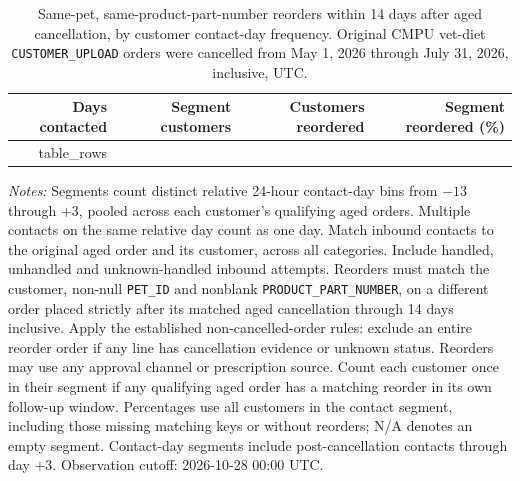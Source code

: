 \begin{table}[!htbp]
\centering
\caption{Same-pet, same-product-part-number reorders within 14 days after aged cancellation, by customer contact-day frequency. Original CMPU vet-diet \texttt{CUSTOMER\_UPLOAD} orders were cancelled from May 1, 2026 through July 31, 2026, inclusive, UTC.}
\label{tab:contact-frequency-same-pet-part-reorders}
\begin{tabular}{@{}rrrr@{}}
\toprule
Days contacted & Segment customers & Customers reordered & Segment reordered (\%) \\
\midrule
{{ table_rows }}
\bottomrule
\end{tabular}

\begin{minipage}{\linewidth}
\footnotesize
\textit{Notes:} Segments count distinct relative 24-hour contact-day bins from
$-13$ through $+3$, pooled across each customer's qualifying aged orders.
Multiple contacts on the same relative day count as one day. Match inbound
contacts to the original aged order and its customer, across all categories.
Include handled, unhandled and unknown-handled inbound attempts. Reorders must match the customer, non-null \texttt{PET\_ID} and nonblank
\texttt{PRODUCT\_PART\_NUMBER}, on a different order placed strictly after
its matched aged cancellation through 14 days inclusive. Apply the established
non-cancelled-order rules: exclude an entire reorder order if any line has
cancellation evidence or unknown status. Reorders may use any approval channel
or prescription source. Count each customer once in their segment if any
qualifying aged order has a matching reorder in its own follow-up window.
Percentages use all customers in the contact segment, including those missing
matching keys or without reorders; N/A denotes an empty segment. Contact-day
segments include post-cancellation contacts through day $+3$.
Observation cutoff: 2026-10-28 00:00 UTC.
\end{minipage}
\end{table}
